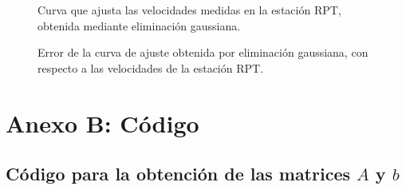 \documentclass[%
	final,
	reprint,
	notitlepage,
	narroweqnarray,
	inline,
	twoside,
	invited
	]{ieee}
\begin{document}
\begin{figure}[H]
\centering
\caption{Curva que ajusta las velocidades medidas en la estación RPT, obtenida mediante eliminación gaussiana.}
\label{dataRPT}
\end{figure}

\begin{figure}[H]
\centering
\caption{Error de la curva de ajuste obtenida por eliminación gaussiana, con respecto a las velocidades de la estación RPT.}
\label{dataRPT}
\end{figure}

\clearpage



\section*{Anexo B: Código}

\subsection{Código para la obtención de las matrices $A$ y $b$}

\end{document}
